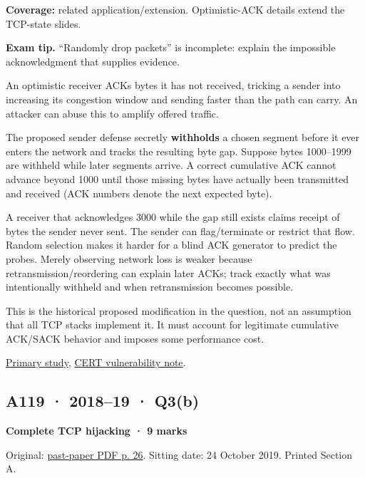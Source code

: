 \documentclass[11pt,a4paper]{article}
\begin{document}
\textbf{Coverage:} related application/\allowbreak{}extension. Optimistic-ACK details extend the TCP-state slides.



{\color{ForestGreen}\textbf{Exam tip.} “Randomly drop packets” is incomplete: explain the impossible acknowledgment that supplies evidence.}


An optimistic receiver ACKs bytes it has not received,\allowbreak{} tricking a sender into increasing its congestion window and sending faster than the path can carry. An attacker can abuse this to amplify offered traffic.


The proposed sender defense secretly \textbf{withholds} a chosen segment before it ever enters the network and tracks the resulting byte gap. Suppose bytes 1000–1999 are withheld while later segments arrive. A correct cumulative ACK cannot advance beyond 1000 until those missing bytes have actually been transmitted and received (ACK numbers denote the next expected byte).


A receiver that acknowledges 3000 while the gap still exists claims receipt of bytes the sender never sent. The sender can flag/\allowbreak{}terminate or restrict that flow. Random selection makes it harder for a blind ACK generator to predict the probes. Merely observing network loss is weaker because retransmission/\allowbreak{}reordering can explain later ACKs; track exactly what was intentionally withheld and when retransmission becomes possible.


This is the historical proposed modification in the question,\allowbreak{} not an assumption that all TCP stacks implement it. It must account for legitimate cumulative ACK/\allowbreak{}SACK behavior and imposes some performance cost.


\href{https://drum.lib.umd.edu/items/d435007a-3809-4c75-8e4f-85ae20c5d5e7}{Primary study},\allowbreak{} \href{https://www.kb.cert.org/vuls/id/102014}{CERT vulnerability note}.




\clearpage
\subsection{A119 · 2018–19 · Q3(b)}\label{a119}

\textbf{Complete TCP hijacking · 9 marks}


Original: \href{../../CSE405-Security_Merged.pdf\#page=26}{past-paper PDF p. 26}. Sitting date: 24 October 2019. Printed Section A.
\end{document}
